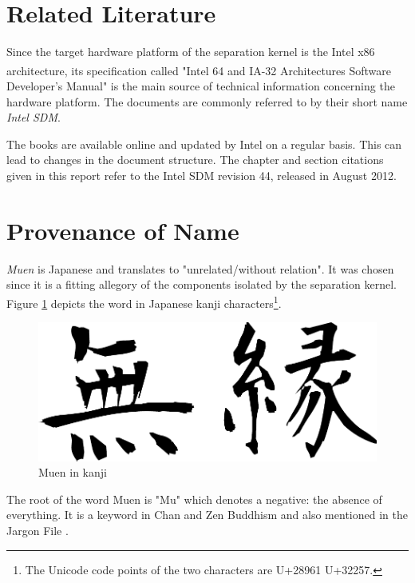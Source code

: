 \section{Related Literature}
Since the target hardware platform of the separation kernel is the Intel x86
architecture, its specification called "Intel\textsuperscript{\textregistered}
64 and IA-32 Architectures Software Developer's Manual"
\cite{IntelSDM} is the main source of technical information
concerning the hardware platform. The documents are commonly referred to by
their short name \emph{Intel SDM}.

The books are available online and updated by Intel on a regular basis. This
can lead to changes in the document structure. The chapter and section
citations given in this report refer to the Intel SDM revision 44, released in
August 2012.

\section{Provenance of Name}
\emph{Muen} is Japanese and translates to "unrelated/without
relation". It was chosen since it is a fitting allegory of the components
isolated by the separation kernel. Figure \ref{fig:muen} depicts the word in
Japanese kanji characters\footnote{The Unicode code points of the two characters
are U+28961 U+32257.}.

\begin{figure}[h]
	\centering
	\includegraphics[scale=0.4]{images/muen.pdf}
	\caption{Muen in kanji}
	\label{fig:muen}
\end{figure}

The root of the word Muen is "Mu" which denotes a negative: the absence of
everything. It is a keyword in Chan and Zen Buddhism and also mentioned in the
Jargon File \cite{jargonfile}.
